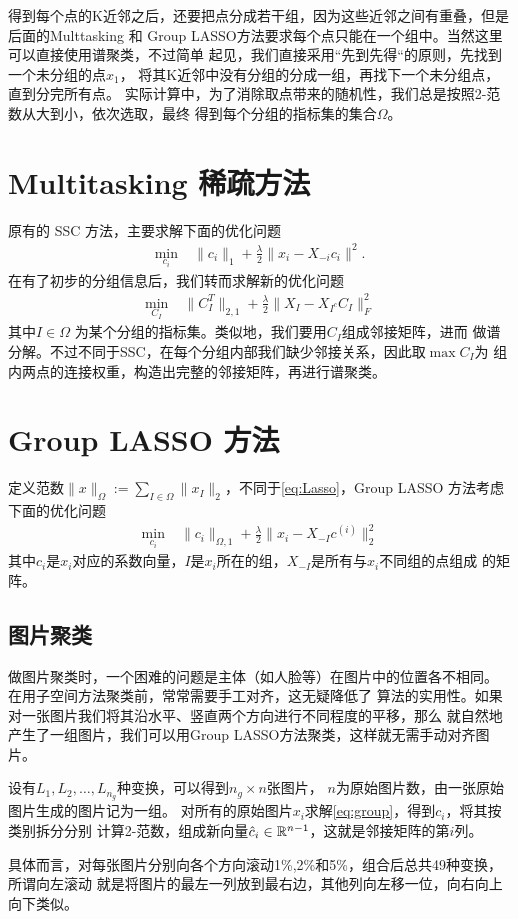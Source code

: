 \documentclass[main]{subfiles}
\begin{document}
得到每个点的K近邻之后，还要把点分成若干组，因为这些近邻之间有重叠，但是后面的Multtasking
和 Group LASSO方法要求每个点只能在一个组中。当然这里可以直接使用谱聚类，不过简单
起见，我们直接采用“先到先得“的原则，先找到一个未分组的点$x_1$，
将其K近邻中没有分组的分成一组，再找下一个未分组点，直到分完所有点。
实际计算中，为了消除取点带来的随机性，我们总是按照2-范数从大到小，依次选取，最终
得到每个分组的指标集的集合$\Omega$。

\section{Multitasking 稀疏方法}
原有的 SSC 方法，主要求解下面的优化问题
\begin{align}\label{eq:Lasso}
  \min_{c_i} \; &\|c_i\|_1+\frac{\lambda}{2}\|x_i-X_{-i}c_i\|^2.
\end{align}
在有了初步的分组信息后，我们转而求解新的优化问题
\begin{align} \label{eq:Multi}
  \min_{C_I}\; & \|C_I^T\|_{2, 1} + \frac{\lambda}{2} \|X_I - X_{I^c}C_I\|_F^2
\end{align}
其中$I\in \Omega$ 为某个分组的指标集。类似地，我们要用$C_I$组成邻接矩阵，进而
做谱分解。不过不同于SSC，在每个分组内部我们缺少邻接关系，因此取$\max C_I$为
组内两点的连接权重，构造出完整的邻接矩阵，再进行谱聚类。

\section{Group LASSO 方法}

定义范数$\|x\|_{\Omega}:=\sum_{I\in \Omega} \|x_I\|_2$，不同于\ref{eq:Lasso}，Group LASSO 方法考虑下面的优化问题
\begin{align}
  \min_{c_i} \; & \|c_i\|_{\Omega, 1} + \frac{\lambda}{2} \|x_i - X_{-I}
  c^{(i)}\|_2^2
  \label{eq:group}
\end{align}
其中$c_i$是$x_i$对应的系数向量，$I$是$x_i$所在的组，$X_{-I}$是所有与$x_i$不同组的点组成
的矩阵。

\subsection{图片聚类}
做图片聚类时，一个困难的问题是主体（如人脸等）在图片中的位置各不相同。
在用子空间方法聚类前，常常需要手工对齐\cite{elhamifar2012arxiv}，这无疑降低了
算法的实用性。如果对一张图片我们将其沿水平、竖直两个方向进行不同程度的平移，那么
就自然地产生了一组图片，我们可以用Group LASSO方法聚类，这样就无需手动对齐图片。

设有$L_1, L_2, \ldots, L_{n_g}$种变换，可以得到$n_g \times n$张图片，
$n$为原始图片数，由一张原始图片生成的图片记为一组。
对所有的原始图片$x_i$求解\ref{eq:group}，得到$c_i$，将其按类别拆分分别
计算2-范数，组成新向量$\hat{c}_i \in \mathbb{R}^{n-1}$，这就是邻接矩阵的第$i$列。

具体而言，对每张图片分别向各个方向滚动1\%,2\%和5\%，组合后总共49种变换，所谓向左滚动
就是将图片的最左一列放到最右边，其他列向左移一位，向右向上向下类似。
\end{document}
